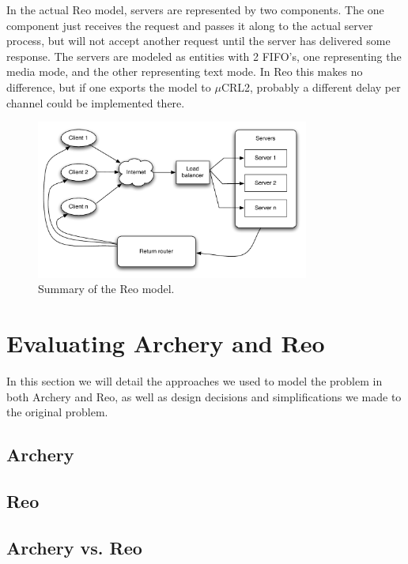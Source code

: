 \documentclass[a4paper]{article}
\newcommand{\ar}{Archery\xspace}
\newcommand{\re}{Reo\xspace}
\newcommand{\mcrl}{$\mu$CRL2\xspace}
\begin{document}
In the actual \re model, servers are represented by two components. The one
component just receives the request and passes it along to the actual server
process, but will not accept another request until the server has delivered some
response. The servers are modeled as entities with 2 FIFO's, one representing
the media mode, and the other representing text mode. In \re this makes no
difference, but if one exports the model to \mcrl, probably a different delay
per channel could be
implemented there. 

\begin{figure}[h]
    \begin{center}
        \includegraphics[width=0.8\textwidth]{images/reo-model.pdf}
    \end{center}
    \caption{Summary of the \re model.}
    \label{fig:reo}
\end{figure}

%
%
\section{Evaluating \ar and \re}

In this section we will detail the approaches we used to model the problem in
both \ar and \re, as well as design decisions and simplifications we made to the
original problem.



\subsection{\ar}


\subsection{\re}


\subsection{\ar vs. \re}
\end{document}
